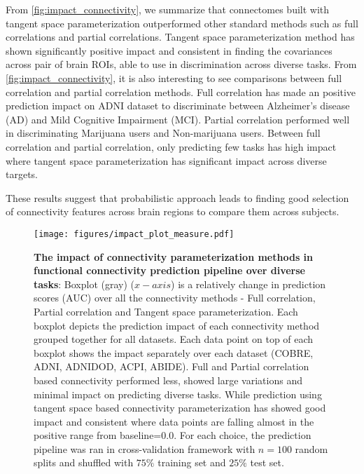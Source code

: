\documentclass[5p]{elsarticle}
\begin{document}
From \autoref{fig:impact_connectivity}, we summarize that connectomes built
with tangent space parameterization outperformed other standard methods
such as full correlations and partial correlations.
Tangent space parameterization method has shown significantly positive impact
and consistent in finding the covariances across pair of brain ROIs, able
to use in discrimination across diverse tasks. From
\autoref{fig:impact_connectivity}, it is also interesting to see comparisons
between full correlation and partial correlation methods. Full correlation
has made an positive prediction impact on ADNI dataset to discriminate
between Alzheimer's disease (AD) and Mild Cognitive Impairment (MCI). Partial
correlation performed well in discriminating Marijuana users and Non-marijuana
users. Between full correlation and partial correlation, only predicting few
tasks has high impact where tangent space parameterization has significant
impact across diverse targets.

These results suggest that probabilistic approach leads to finding good
selection of connectivity features across brain regions to compare them across
subjects.


\begin{figure}
    \centerline{%
    \texttt{[image: figures/impact\_plot\_measure.pdf]}%
    }%
    \caption[choice of connectome]{\textbf{The impact of connectivity
            parameterization methods in functional connectivity prediction
            pipeline over diverse tasks}:
            Boxplot (gray) ($x-axis$) is a relatively change in prediction scores
            (AUC) over all the connectivity methods - Full correlation, Partial
            correlation and Tangent space parameterization. Each boxplot
            depicts the prediction impact of each connectivity method grouped
            together for all datasets. Each data
            point on top of each boxplot shows the impact separately
            over each dataset (COBRE, ADNI, ADNIDOD, ACPI, ABIDE). Full and Partial
            correlation based connectivity performed less, showed
            large variations and minimal impact on predicting diverse tasks.
            While prediction using tangent space based connectivity
            parameterization has showed good impact and consistent where
            data points are falling almost in the positive range from
            baseline=$0.0$. For each choice, the prediction pipeline
            was ran in cross-validation framework with $n=100$ random splits
            and shuffled with $75\%$ training set and $25\%$ test set.
\label{fig:impact_connectivity}}
\end{figure}
\end{document}
